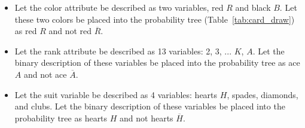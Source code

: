 \begin{itemize}
\item Let the color attribute be described as two variables, red $R$ and black $B$.  Let these two colors be placed into the probability tree (Table~\ref{tab:card_draw}) as red $R$ and not red $\overline{R}$.  
\item Let the rank attribute be described as 13 variables: 2, 3, ... $K$, $A$.   Let the binary description of these variables be placed into the probability tree as ace $A$ and not ace $\overline{A}$.  
\item Let the suit variable be described as 4 variables: hearts $H$, spades, diamonds, and clubs.  Let the binary description of these variables be placed into the probability tree as hearts $H$ and not hearts $\overline{H}$.
\end{itemize}

